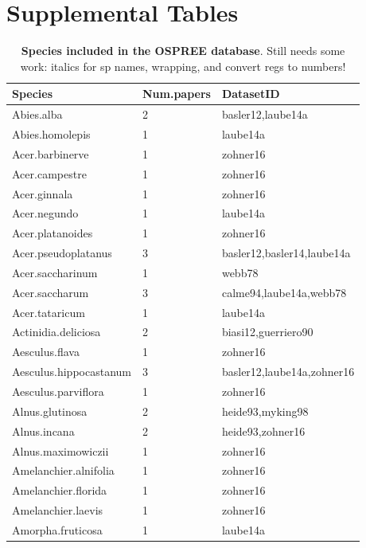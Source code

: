 \documentclass{article}
\begin{document}
\section* {Supplemental Tables}
\begin{footnotesize} 
\begingroup\footnotesize
\begin{longtable}{|p{}|p{}|p{}|}
\caption{\textbf{Species included in the OSPREE database}. Still needs some work: italics for sp names, wrapping, and convert regs to numbers!
} \\ 
  \hline
Species & Num.papers & DatasetID \\ 
  \hline
Abies.alba &   2 & basler12,laube14a \\ 
  Abies.homolepis &   1 & laube14a \\ 
  Acer.barbinerve &   1 & zohner16 \\ 
  Acer.campestre &   1 & zohner16 \\ 
  Acer.ginnala &   1 & zohner16 \\ 
  Acer.negundo &   1 & laube14a \\ 
  Acer.platanoides &   1 & zohner16 \\ 
  Acer.pseudoplatanus &   3 & basler12,basler14,laube14a \\ 
  Acer.saccharinum &   1 & webb78 \\ 
  Acer.saccharum &   3 & calme94,laube14a,webb78 \\ 
  Acer.tataricum &   1 & laube14a \\ 
  Actinidia.deliciosa &   2 & biasi12,guerriero90 \\ 
  Aesculus.flava &   1 & zohner16 \\ 
  Aesculus.hippocastanum &   3 & basler12,laube14a,zohner16 \\ 
  Aesculus.parviflora &   1 & zohner16 \\ 
  Alnus.glutinosa &   2 & heide93,myking98 \\ 
  Alnus.incana &   2 & heide93,zohner16 \\ 
  Alnus.maximowiczii &   1 & zohner16 \\ 
  Amelanchier.alnifolia &   1 & zohner16 \\ 
  Amelanchier.florida &   1 & zohner16 \\ 
  Amelanchier.laevis &   1 & zohner16 \\ 
  Amorpha.fruticosa &   1 & laube14a \\ 

\end{longtable}
\end{footnotesize}
\end{document}

